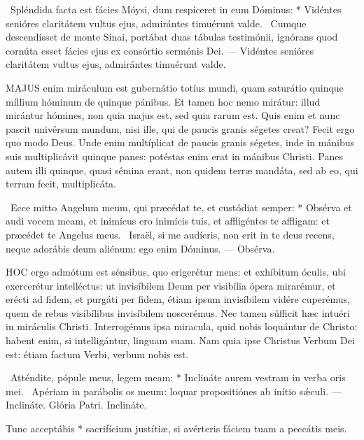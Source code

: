 \R\ Spléndida facta est fácies Móysi, dum respíceret in eum Dóminus: * Vidéntes senióres claritátem vultus ejus, admirántes timuérunt valde. \V\ Cumque descendísset de monte Sínai, portábat duas tábulas testimónii, ignórans quod cornúta esset fácies ejus ex consórtio sermónis Dei. --- Vidéntes senióres claritátem vultus ejus, admirántes timuérunt valde.


\lettrine[lines=2]{M}{AJUS} enim miráculum est gubernátio totíus mundi, quam saturátio quinque míllium hóminum de quinque pánibus. Et tamen hoc nemo mirátur: illud mirántur hómines, non quia majus est, sed quia rarum est. Quis enim et nunc pascit univérsum mundum, nisi ille, qui de paucis granis ségetes creat? Fecit ergo quo modo Deus. Unde enim multíplicat de paucis granis ségetes, inde in mánibus suis multiplicávit quinque panes: potéstas enim erat in mánibus Christi. Panes autem illi quinque, quasi sémina erant, non quidem terræ mandáta, sed ab eo, qui terram fecit, multiplicáta.

\R\ Ecce mitto Angelum meum, qui præcédat te, et custódiat semper: * Obsérva et audi vocem meam, et inimícus ero inimícis tuis, et affligéntes te affligam: et præcédet te Angelus meus. \V\ Israël, si me audíeris, non erit in te deus recens, neque adorábis deum aliénum: ego enim Dóminus. --- Obsérva.


\lettrine[lines=2]{H}{OC} ergo admótum est sénsibus, quo erigerétur mens: et exhíbitum óculis, ubi exercerétur intelléctus: ut invisíbilem Deum per visibília ópera mirarémur, et erécti ad fidem, et purgáti per fidem, étiam ipsum invisíbilem vidére cuperémus, quem de rebus visibílibus invisíbilem noscerémus. Nec tamen súfficit hæc intuéri in miráculis Christi. Interrogémus ipsa miracula, quid nobis loquántur de Christo: habent enim, si intelligántur, linguam suam. Nam quia ipse Christus Verbum Dei est: étiam factum Verbi, verbum nobis est.

\R\ Atténdite, pópule meus, legem meam: * Inclináte aurem vestram in verba oris mei. \V\ Apériam in parábolis os meum: loquar propositiónes ab inítio sǽculi. --- Inclináte. Glória Patri. Inclináte.


 Tunc acceptábis * sacrifícium justítiæ, si avérteris fáciem tuam a peccátis meis.


